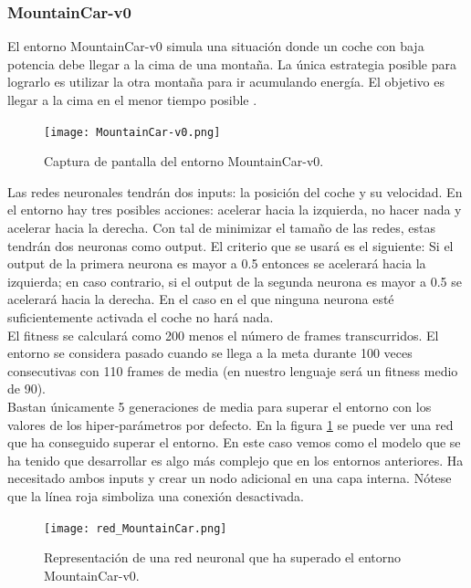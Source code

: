 \documentclass{article}
\begin{document}
\subsubsection{MountainCar-v0}
El entorno MountainCar-v0 simula una situación donde un coche con baja potencia debe llegar a la cima de una montaña. La única estrategia posible para lograrlo es utilizar la otra montaña para ir acumulando energía. El objetivo es llegar a la cima en el menor tiempo posible \cite{MountainCarv0openaigymWikiGitHub}.\\

\begin{figure}[htbp]
\centering
\texttt{[image: MountainCar-v0.png]}
\caption{Captura de pantalla del entorno MountainCar-v0.}
\end{figure}

Las redes neuronales tendrán dos inputs: la posición del coche y su velocidad. En el entorno hay tres posibles acciones: acelerar hacia la izquierda, no hacer nada y acelerar hacia la derecha. Con tal de minimizar el tamaño de las redes, estas tendrán dos neuronas como output. El criterio que se usará es el siguiente: Si el output de la primera neurona es mayor a 0.5 entonces se acelerará hacia la izquierda; en caso contrario, si el output de la segunda neurona es mayor a 0.5 se acelerará hacia la derecha. En el caso en el que ninguna neurona esté suficientemente activada el coche no hará nada.\\

El fitness se calculará como 200 menos el número de frames transcurridos. El entorno se considera pasado cuando se llega a la meta durante 100 veces consecutivas con 110 frames de media (en nuestro lenguaje será un fitness medio de 90).\\

Bastan únicamente 5 generaciones de media para superar el entorno con los valores de los hiper-parámetros por defecto. En la figura \ref{fig:red_MountainCar-v0} se puede ver una red que ha conseguido superar el entorno. En este caso vemos como el modelo que se ha tenido que desarrollar es algo más complejo que en los entornos anteriores. Ha necesitado ambos inputs y crear un nodo adicional en una capa interna. Nótese que la línea roja simboliza una conexión desactivada.
\begin{figure}[htbp]
\centering
\texttt{[image: red\_MountainCar.png]}
\caption{Representación de una red neuronal que ha superado el entorno MountainCar-v0.}
\label{fig:red_MountainCar-v0}
\end{figure}
\end{document}
